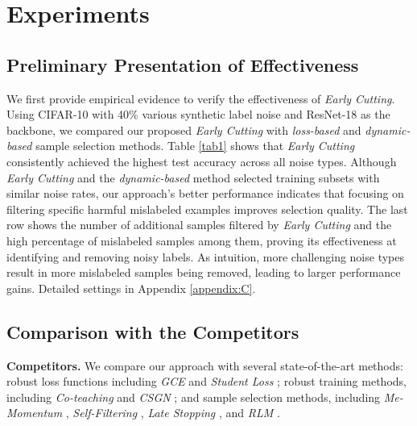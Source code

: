 \section{Experiments}
\subsection{Preliminary Presentation of Effectiveness}
\label{section:4_0}
We first provide empirical evidence to verify the effectiveness of \emph{Early Cutting}. Using CIFAR-10 with 40\% various synthetic label noise and ResNet-18 as the backbone, we compared our proposed \emph{Early Cutting} with \emph{loss-based} and \emph{dynamic-based} sample selection methods. Table \ref{tab1} shows that \emph{Early Cutting} consistently achieved the highest test accuracy across all noise types. Although \emph{Early Cutting} and the \emph{dynamic-based} method selected training subsets with similar noise rates, our approach's better performance indicates that focusing on filtering specific harmful mislabeled examples improves selection quality.
The last row shows the number of additional samples filtered by \emph{Early Cutting} and the high percentage of mislabeled samples among them, proving its effectiveness at identifying and removing noisy labels. As intuition, more challenging noise types result in more mislabeled samples being removed, leading to larger performance gains. Detailed settings in Appendix \ref{appendix:C}.

\subsection{Comparison with the Competitors}
\label{section:4_1}
\textbf{Competitors.}
We compare our approach with several state-of-the-art methods: robust loss functions including \textit{GCE} \cite{zhang2018generalized} and \textit{Student Loss} \cite{10412669}; robust training methods, including \textit{Co-teaching} \cite{han2018co} and \textit{CSGN} \cite{linlearning}; and sample selection methods, including \textit{Me-Momentum} \cite{bai2021me}, \textit{Self-Filtering} \cite{wei2022self}, \textit{Late Stopping} \cite{yuan2023late}, and \textit{RLM} \cite{li2024regroup}. 




